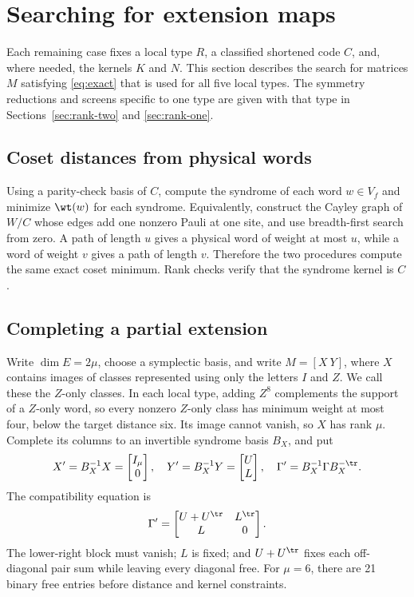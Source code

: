 \section{Searching for extension maps}\label{sec:search}

Each remaining case fixes a local type \(R\), a classified shortened
code \(C\), and, where needed, the kernels \(K\) and \(N\). This section
describes the search for matrices \(M\) satisfying \eqref{eq:exact}
that is used for all five local types. The symmetry reductions and
screens specific to one type are given with that type in
Sections~\ref{sec:rank-two} and \ref{sec:rank-one}.

\subsection{Coset distances from physical words}

Using a parity-check basis of \(C\), compute the syndrome of each word
\(w\in V_f\) and minimize \(\wt(w)\) for each syndrome.
Equivalently, construct the Cayley graph of \(W/C\) whose edges add
one nonzero Pauli at one site, and use breadth-first search from zero.
A path of length \(u\) gives a physical word of weight at most \(u\),
while a word of weight \(v\) gives a path of length \(v\). Therefore
the two procedures compute the same exact coset minimum. Rank checks
verify that the syndrome kernel is \(C\).

\subsection{Completing a partial extension}\label{sec:completion}

Write \(\dim E=2\mu\), choose a symplectic basis, and write \(M=[X\ Y]\),
where \(X\) contains images of classes represented using only the letters
\(I\) and \(Z\). We call these the \(Z\)-only classes. In each local
type, adding \(Z^8\) complements the support of a \(Z\)-only word, so
every nonzero \(Z\)-only class has minimum weight at most four, below the
target distance six. Its image cannot vanish, so \(X\) has rank \(\mu\).
Complete its columns to an invertible syndrome basis \(B_X\), and put
\[
 X'=B_X^{-1}X=\begin{bmatrix}I_\mu\\0\end{bmatrix},\quad
 Y'=B_X^{-1}Y=\begin{bmatrix}U\\L\end{bmatrix},\quad
 \Gamma'=B_X^{-1}\Gamma B_X^{-\tr}.
\]
The compatibility equation is
\begin{equation}\label{eq:Y-normal}
 \Gamma'=\begin{bmatrix}U+U^\tr&L^\tr\\L&0\end{bmatrix}.
\end{equation}
The lower-right block must vanish; \(L\) is fixed; and
\(U+U^\tr\) fixes each off-diagonal pair sum while leaving every
diagonal free. For \(\mu=6\), there are 21 binary free entries before
distance and kernel constraints.

